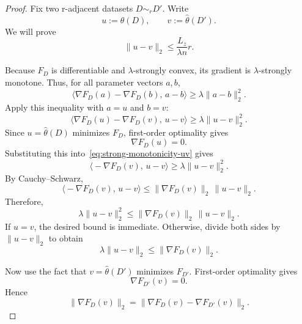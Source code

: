 \documentclass[11pt,a4paper]{report}
\theoremstyle{plain}
\theoremstyle{definition}
\theoremstyle{remark}
\begin{document}
\begin{proof}
Fix two r-adjacent datasets $D\sim_r D'$. Write
\[
u:=\hat\theta(D),
\qquad
v:=\hat\theta(D').
\]
We will prove
\[
\|u-v\|_2\le \frac{L_z}{\lambda n}r.
\]

Because $F_D$ is differentiable and $\lambda$-strongly convex, its gradient is $\lambda$-strongly monotone. Thus, for all parameter vectors $a,b$,
\[
\big\langle \nabla F_D(a)-\nabla F_D(b),\,a-b\big\rangle
\ge
\lambda\|a-b\|_2^2.
\]
Apply this inequality with $a=u$ and $b=v$:
\begin{equation}
\label{eq:strong-monotonicity-uv}
\big\langle \nabla F_D(u)-\nabla F_D(v),\,u-v\big\rangle
\ge
\lambda\|u-v\|_2^2.
\end{equation}
Since $u=\hat\theta(D)$ minimizes $F_D$, first-order optimality gives
\[
\nabla F_D(u)=0.
\]
Substituting this into~\eqref{eq:strong-monotonicity-uv} gives
\[
\big\langle -\nabla F_D(v),\,u-v\big\rangle
\ge
\lambda\|u-v\|_2^2.
\]
By Cauchy--Schwarz,
\[
\big\langle -\nabla F_D(v),\,u-v\big\rangle
\le
\|\nabla F_D(v)\|_2\,\|u-v\|_2.
\]
Therefore,
\[
\lambda\|u-v\|_2^2
\le
\|\nabla F_D(v)\|_2\,\|u-v\|_2.
\]
If $u=v$, the desired bound is immediate. Otherwise, divide both sides by $\|u-v\|_2$ to obtain
\begin{equation}
\label{eq:distance-controlled-by-gradient}
\lambda\|u-v\|_2
\le
\|\nabla F_D(v)\|_2.
\end{equation}

Now use the fact that $v=\hat\theta(D')$ minimizes $F_{D'}$. First-order optimality gives
\[
\nabla F_{D'}(v)=0.
\]
Hence
\begin{equation}
\label{eq:gradient-rewrite}
\|\nabla F_D(v)\|_2
=
\|\nabla F_D(v)-\nabla F_{D'}(v)\|_2.
\end{equation}


\end{proof}
\end{document}
